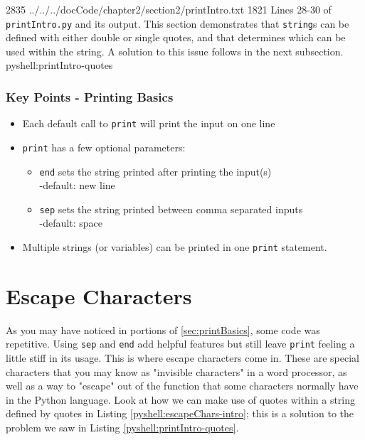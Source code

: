 \documentclass[oneside]{book}
\begin{document}
{28}{35}
{../../../docCode/chapter2/section2/printIntro.txt}
{18}{21}
{Lines 28-30 of \texttt{printIntro.py} and its output. This section demonstrates that \texttt{string}s can be defined with either double or single quotes, and that determines which can be used within the string. A solution to this issue follows in the next subsection.}
{pyshell:printIntro-quotes}

\FloatBarrier

\subsubsection*{Key Points - Printing Basics}
\begin{itemize}
    \item Each default call to \texttt{print} will print the input on one line
    \item \texttt{print} has a few optional parameters: 
    \begin{itemize}
        \item \texttt{end} sets the string printed after printing the input(s)\\-default: new line
        \item \texttt{sep} sets the string printed between comma separated inputs\\-default: space
    \end{itemize}
    \item Multiple strings (or variables) can be printed in one \texttt{print} statement. 
\end{itemize}

\section{Escape Characters}\label{sec:escapeChars}

As you may have noticed in portions of \ref{sec:printBasics}, some code was repetitive. Using \texttt{sep} and \texttt{end} add helpful features but still leave \texttt{print} feeling a little stiff in its usage. This is where escape characters come in. These are special characters that you may know as "invisible characters" in a word processor, as well as a way to "escape" out of the function that some characters normally have in the Python language. Look at how we can make use of quotes within a string defined by quotes in Listing \ref{pyshell:escapeChars-intro}; this is a solution to the problem we saw in Listing \ref{pyshell:printIntro-quotes}.
 
\end{document}
